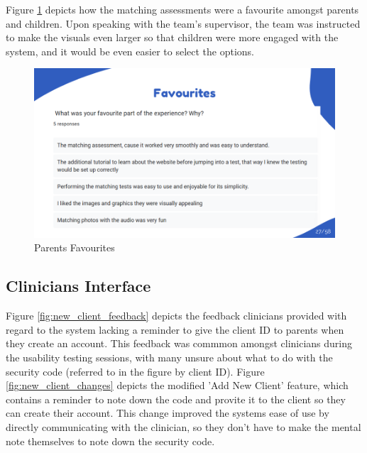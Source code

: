 \documentclass{article}
\begin{document}
\newpage

Figure \ref{fig:matching_feedback} depicts how the matching assessments were a favourite amongst parents and children. Upon speaking with the team's supervisor, 
the team was instructed to make the visuals even larger so that children were more engaged with the system, and it would be even easier to select the options.

\begin{figure}[H]
  \centering
  \includegraphics[width=\textwidth]{images/slide27.png}
  \caption{Parents Favourites}
  \label{fig:matching_feedback}
\end{figure}

\newpage

\subsection{Clinicians Interface}

\hspace{2em} Figure \ref{fig:new_client_feedback} depicts the feedback clinicians provided with regard to the system lacking a reminder to give the client ID to parents when they create an account.
This feedback was commmon amongst clinicians during the usability testing sessions, with many unsure about what to do with the security code (referred to in the figure by client ID).
Figure \ref{fig:new_client_changes} depicts the modified 'Add New Client' feature, which contains a reminder to note down the code and provite it to the client so they can create their account.
This change improved the systems ease of use by directly communicating with the clinician, so they don't have to make the mental note themselves to note down the security code.
\end{document}
